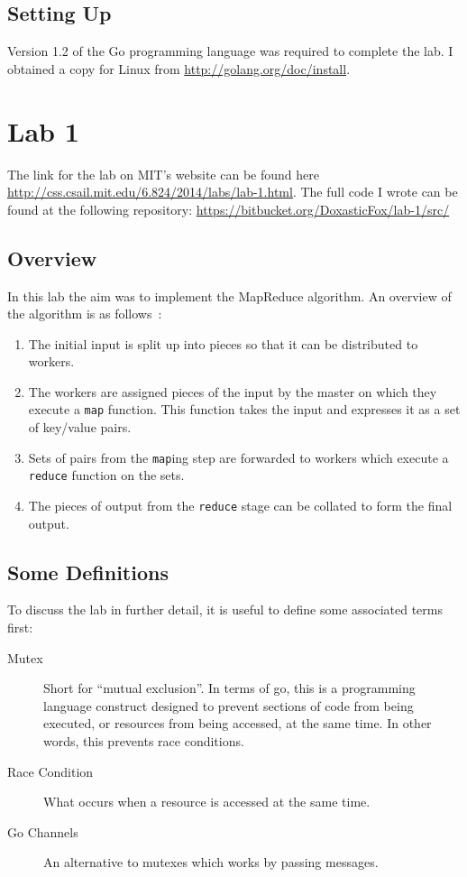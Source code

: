 \documentclass[11pt,a4paper]{report}
\begin{document}
	\subsection{Setting Up}
	Version 1.2 of the Go programming language was required to complete the lab. I obtained a copy for Linux from \url{http://golang.org/doc/install}.
	
	\section{Lab 1}
	The link for the lab on MIT's website can be found here \url{http://css.csail.mit.edu/6.824/2014/labs/lab-1.html}.
	The full code I wrote can be found at the following repository: \url{https://bitbucket.org/DoxasticFox/lab-1/src/}
	
	\subsection{Overview}
	In this lab the aim was to implement the MapReduce algorithm. An overview of the algorithm is as follows~\cite{Dean:2008:MSD:1327452.1327492}:
	\begin{enumerate}
		\item The initial input is split up into pieces so that it can be distributed to workers.
		\item The workers are assigned pieces of the input by the master on which they execute a \verb=map= function. This function takes the input and expresses it as a set of key/value pairs.
		\item Sets of pairs from the \verb=map=ing step are forwarded to workers which execute a \verb=reduce= function on the sets.
		\item The pieces of output from the \verb=reduce= stage can be collated to form the final output.
	\end{enumerate}
	
	\subsection{Some Definitions}
	To discuss the lab in further detail, it is useful to define some associated terms first:
	\begin{description}
	\item[Mutex] Short for ``mutual exclusion''. In terms of go, this is a programming language construct designed to prevent sections of code from being executed, or resources from being accessed, at the same time. In other words, this prevents race conditions.
	\item[Race Condition] What occurs when a resource is accessed at the same time.
	\item[Go Channels] An alternative to mutexes which works by passing messages.
	\end{description}
	
\end{document}
